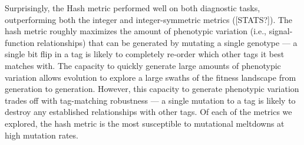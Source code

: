 Surprisingly, the Hash metric performed well on both diagnostic tasks, outperforming both the integer and integer-symmetric metrics ([STATS?]).
The hash metric roughly maximizes the amount of phenotypic variation (i.e., signal-function relationships) that can be generated by mutating a single genotype --- a single bit flip in a tag is likely to completely re-order which other tags it best matches with.
The capacity to quickly generate large amounts of phenotypic variation allows evolution to explore a large swaths of the fitness landscape from generation to generation.
However, this capacity to generate phenotypic variation trades off with tag-matching robustness --- a single mutation to a tag is likely to destroy any established relationships with other tags.
Of each of the metrics we explored, the hash metric is the most susceptible to mutational meltdowns at high mutation rates.




